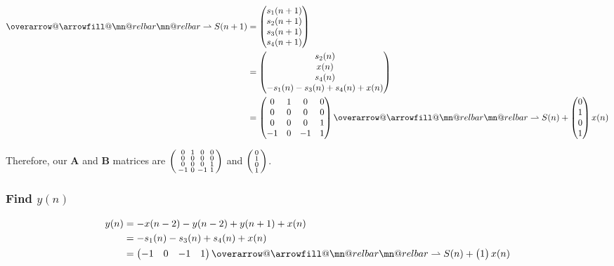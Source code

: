 \documentclass{article}
\makeatletter
\newenvironment{directsubsubs}{
  \makeatletter
  \renewcommand\thesubsubsection{\thesection.\Roman{subsubsection}}
  \makeatother
}{
  \makeatletter
  \renewcommand\thesubsubsection{\thesubsection.\Roman{subsubsection}}
  \makeatother
}
\renewcommand{\thesubsection}{\thesection.\alph{subsection}}
\renewcommand{\thesubsubsection}{\thesection.\alph{subsection}.\Roman{subsubsection}}
\DeclareRobustCommand{\overrightharpoon}{\mathpalette{\overarrow@\rightharpoonfill@}}
\def\rightharpoonfill@{\arrowfill@\mn@relbar\mn@relbar\rightharpoonup}
\makeatother
\begin{document}
\begin{directsubsubs}
	\begin{align*}
		\overrightharpoon{S(n + 1)} &= \begin{pmatrix} s_1(n + 1) \\ s_2(n + 1) \\ s_3(n + 1) \\ s_4(n + 1) \end{pmatrix} \\
		&= \begin{pmatrix} s_2(n) \\ x(n) \\ s_4(n) \\ -s_1(n) - s_3(n) + s_4(n) + x(n) \end{pmatrix} \\
		&= \begin{pmatrix} 0 & 1 & 0 & 0 \\ 0 & 0 & 0 & 0 \\ 0 & 0 & 0 & 1 \\ -1 & 0 & -1 & 1 \end{pmatrix}\overrightharpoon{S(n)} + \begin{pmatrix} 0 \\ 1 \\ 0 \\ 1 \end{pmatrix}x(n)
	\end{align*}

	Therefore, our $\boldsymbol{A}$ and $\boldsymbol{B}$ matrices are $\begin{psmallmatrix} 0 & 1 & 0 & 0 \\ 0 & 0 & 0 & 0 \\ 0 & 0 & 0 & 1 \\ -1 & 0 & -1 & 1 \end{psmallmatrix}$ and $\begin{psmallmatrix} 0 \\ 1 \\ 0 \\ 1 \end{psmallmatrix}$.

	\subsubsection[~\thesubsubsection]{Find $y(n)$}

	\begin{align*}
		y(n) &= -x(n - 2) - y(n - 2) + y(n + 1) + x(n) \\
		&= -s_1(n) -s_3(n) + s_4(n) + x(n) \\
		&= \begin{pmatrix} -1 & 0 & -1 & 1 \end{pmatrix}\overrightharpoon{S(n)} + \begin{pmatrix} 1 \end{pmatrix}x(n)
	\end{align*}


\end{directsubsubs}
\end{document}
